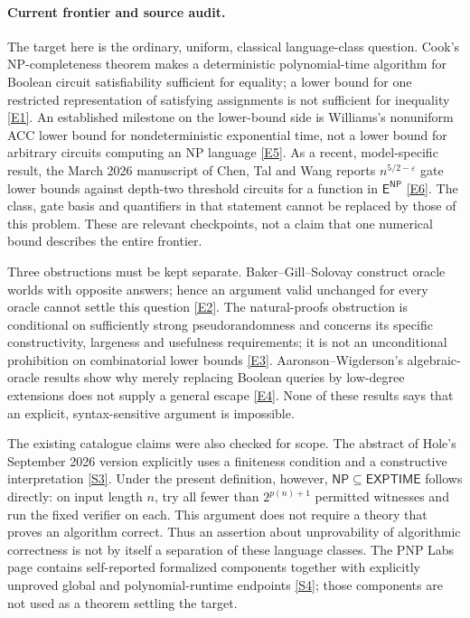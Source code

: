 \documentclass[11pt]{article}
\newcommand{\sref}[2]{\hyperlink{source:#1:#2}{[S#2]}}
\newcommand{\eref}[2]{\hyperlink{extra:#1:#2}{[E#2]}}
\begin{document}
\paragraph{Current frontier and source audit.}
The target here is the ordinary, uniform, classical language-class question.
Cook's NP-completeness theorem makes a deterministic polynomial-time algorithm
for Boolean circuit satisfiability sufficient for equality; a lower bound for
one restricted representation of satisfying assignments is not sufficient for
inequality \eref{statement}{1}. An established milestone on the lower-bound side is
Williams's nonuniform ACC lower bound for nondeterministic exponential time,
not a lower bound for arbitrary circuits computing an NP language
\eref{statement}{5}. As a recent, model-specific result, the March 2026 manuscript of
Chen, Tal and Wang reports $n^{5/2-\varepsilon}$ gate lower bounds against
depth-two threshold circuits for a function in $\mathsf E^{\mathsf{NP}}$
\eref{statement}{6}. The class, gate basis and quantifiers in that statement cannot be
replaced by those of this problem. These are relevant checkpoints, not a claim
that one numerical bound describes the entire frontier.

Three obstructions must be kept separate. Baker--Gill--Solovay construct oracle
worlds with opposite answers; hence an argument valid unchanged for every
oracle cannot settle this question \eref{statement}{2}. The natural-proofs obstruction
is conditional on sufficiently strong pseudorandomness and concerns its
specific constructivity, largeness and usefulness requirements; it is not an
unconditional prohibition on combinatorial lower bounds \eref{statement}{3}.
Aaronson--Wigderson's algebraic-oracle results show why merely replacing Boolean
queries by low-degree extensions does not supply a general escape
\eref{statement}{4}. None of these results says that an explicit, syntax-sensitive
argument is impossible.

The existing catalogue claims were also checked for scope. The abstract of
Hole's September 2026 version explicitly uses a finiteness condition and a
constructive interpretation \sref{statement}{3}. Under the present definition, however,
$\mathsf{NP}\subseteq\mathsf{EXPTIME}$ follows directly: on input length $n$,
try all fewer than $2^{p(n)+1}$ permitted witnesses and run the fixed verifier
on each. This argument does not require a theory that proves an algorithm
correct. Thus an assertion about unprovability of algorithmic correctness is
not by itself a separation of these language classes. The PNP Labs page
contains self-reported formalized components together with explicitly
unproved global and polynomial-runtime endpoints \sref{statement}{4}; those components
are not used as a theorem settling the target.
\end{document}
